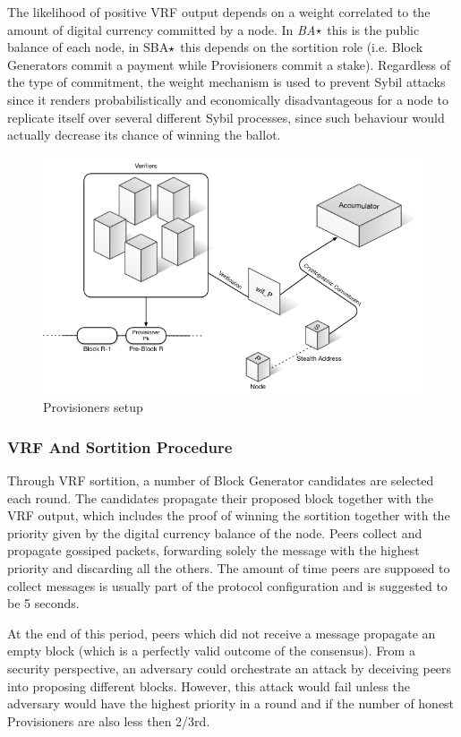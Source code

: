 The likelihood of positive VRF output depends on a weight correlated to the amount of digital currency committed by a node. In \textit{BA$\large\star$} this is the public balance of each node, in SBA$\large\star$ this depends on the sortition role (i.e. Block Generators commit a payment while Provisioners commit a stake). Regardless of the type of commitment, the weight mechanism is used to prevent Sybil attacks since it renders probabilistically and economically disadvantageous for a node to replicate itself over several different Sybil processes, since such behaviour would actually decrease its chance of winning the ballot.

\begin{figure}
\includegraphics[scale=0.5]{Provisioners}
\caption{Provisioners setup}
\end{figure}

\subsubsection{VRF And Sortition Procedure}

Through VRF sortition, a number of Block Generator candidates are selected each round. The candidates propagate their proposed block together with the VRF output, which includes the proof of winning the sortition together with the priority given by the digital currency balance of the node. Peers collect and propagate gossiped packets, forwarding solely the message with the highest priority and discarding all the others. The amount of time peers are supposed to collect messages is usually part of the protocol configuration and is suggested to be 5 seconds.

At the end of this period, peers which did not receive a message propagate an empty block (which is a perfectly valid outcome of the consensus). From a security perspective, an adversary could orchestrate an attack by deceiving peers into proposing different blocks. However, this attack would fail unless the adversary would have the highest priority in a round and if the number of honest Provisioners are also less then 2/3rd.

